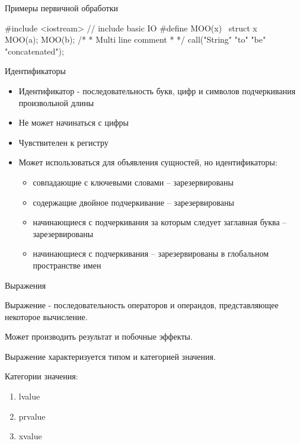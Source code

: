 \documentclass[unknownkeysallowed]{beamer}
\begin{document}
\begin{frame}[fragile]{Примеры первичной обработки}

  \begin{cpp}
    #include <iostream> // include basic IO
    #define MOO(x) \
      struct x \
      { \
      }
    MOO(a);
    MOO(b);
    /*
     *   Multi line comment
     *
     */
    call("String" "to" "be" "concatenated");
  \end{cpp}

\end{frame}

\begin{frame}{Идентификаторы}

  \begin{itemize}
    \item Идентификатор - последовательность букв, цифр и символов подчеркивания произвольной длины
    \item Не может начинаться с цифры
    \item Чувствителен к регистру
    \item Может использоваться для объявления сущностей, но идентификаторы:
      \begin{itemize}
        \item совпадающие с ключевыми словами -- зарезервированы
        \item содержащие двойное подчеркивание -- зарезервированы
        \item начинающиеся с подчеркивания за которым следует заглавная буква -- зарезервированы
        \item начинающиеся с подчеркивания -- зарезервированы в глобальном пространстве имен
      \end{itemize}
  \end{itemize}

\end{frame}

\begin{frame}{Выражения}

Выражение - последовательность операторов и операндов, представляющее некоторое вычисление.\vspace{1em}

Может производить результат и побочные эффекты.\vspace{1em}

Выражение характеризуется типом и категорией значения.\vspace{1em}

Категории значения:
\begin{enumerate}
  \item lvalue
  \item prvalue
  \item xvalue
\end{enumerate}

\end{frame}
\end{document}
